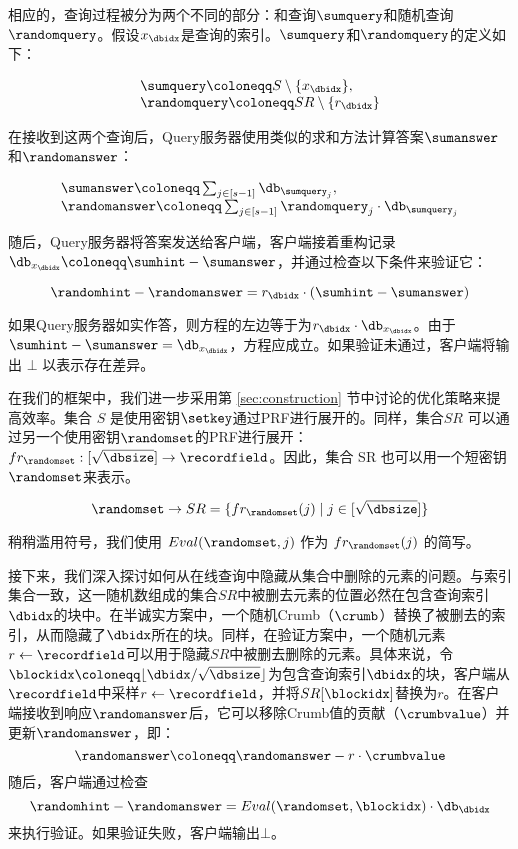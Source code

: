 相应的，查询过程被分为两个不同的部分：和查询$\sumquery$和随机查询$\randomquery$。假设$x_\dbidx$是查询的索引。$\sumquery$和$\randomquery$的定义如下：

$$
    \begin{array}{l}
        \sumquery \coloneqq  S \setminus \{x_\dbidx\}, \\
        \randomquery \coloneqq  SR \setminus \{r_\dbidx\}
    \end{array}
$$

在接收到这两个查询后，Query服务器使用类似的求和方法计算答案$\sumanswer$和$\randomanswer$：

$$
    \begin{array}{l}
        \sumanswer \coloneqq  \sum_{j \in [s-1]} \db_{\sumquery_j}, \\
        \randomanswer \coloneqq  \sum_{j \in [s-1]} \randomquery_j\cdot \db_{\sumquery_j}
    \end{array}
$$

随后，Query服务器将答案发送给客户端，客户端接着重构记录$\db_{x_\dbidx} \coloneqq \sumhint-\sumanswer$，并通过检查以下条件来验证它：

$$
    \randomhint-\randomanswer = r_\dbidx \cdot (\sumhint-\sumanswer)
$$

如果Query服务器如实作答，则方程的左边等于为$r_{\dbidx} \cdot \db_{x_\dbidx}$。由于$\sumhint - \sumanswer = \db_{x_\dbidx}$，方程应成立。如果验证未通过，客户端将输出 $\bot$ 以表示存在差异。

在我们的框架中，我们进一步采用第 \ref{sec:construction} 节中讨论的优化策略来提高效率。集合 $S$ 是使用密钥$\setkey$通过PRF进行展开的。同样，集合$SR$ 可以通过另一个使用密钥$\randomset$的PRF进行展开：$fr_{\randomset}: [\sqrt{\dbsize}] \to \recordfield$。因此，集合 SR 也可以用一个短密钥$\randomset$来表示。

$$
    \randomset \to SR = \{fr_{\randomset}(j) \mid j\in[\sqrt{\dbsize}]\}
$$

稍稍滥用符号，我们使用 $Eval(\randomset, j)$ 作为 $fr_{\randomset}(j)$ 的简写。

接下来，我们深入探讨如何从在线查询中隐藏从集合中删除的元素的问题。与索引集合一致，这一随机数组成的集合$SR$中被删去元素的位置必然在包含查询索引$\dbidx$的块中。在半诚实方案中，一个随机Crumb（$\crumb$）替换了被删去的索引，从而隐藏了$\dbidx$所在的块。同样，在验证方案中，一个随机元素$r \leftarrow \recordfield$可以用于隐藏$SR$中被删去删除的元素。具体来说，令$\blockidx \coloneqq \lfloor \dbidx /\sqrt{\dbsize} \rfloor$为包含查询索引$\dbidx$的块，客户端从$\recordfield$中采样$r \leftarrow \recordfield$，并将$SR[\blockidx]$替换为$r$。在客户端接收到响应$\randomanswer$后，它可以移除Crumb值的贡献（$\crumbvalue$）并更新$\randomanswer$，即：
$$\randomanswer \coloneqq \randomanswer - r\cdot \crumbvalue$$
随后，客户端通过检查
$$\randomhint-\randomanswer = Eval(\randomset,\blockidx)\cdot \db_{\dbidx}$$
来执行验证。如果验证失败，客户端输出$\bot$。

